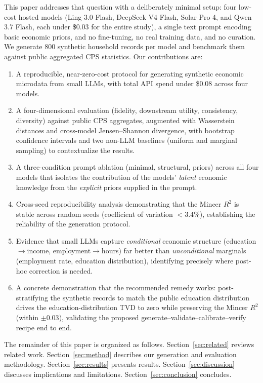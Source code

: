 \documentclass[11pt]{article}
\begin{document}
This paper addresses that question with a deliberately minimal setup: four low-cost hosted models (Ling 3.0 Flash, DeepSeek V4 Flash, Solar Pro 4, and Qwen 3.7 Flash, each under \$0.03 for the entire study), a single text prompt encoding basic economic priors, and no fine-tuning, no real training data, and no curation.
We generate 800 synthetic household records per model and benchmark them against public aggregated CPS statistics.
Our contributions are:

\begin{enumerate}[leftmargin=*, itemsep=2pt]
  \item A reproducible, near-zero-cost protocol for generating synthetic economic microdata from small LLMs, with total API spend under \$0.08 across four models.
  \item A four-dimensional evaluation (fidelity, downstream utility, consistency, diversity) against public CPS aggregates, augmented with Wasserstein distances and cross-model Jensen--Shannon divergence, with bootstrap confidence intervals and two non-LLM baselines (uniform and marginal sampling) to contextualize the results.
  \item A three-condition prompt ablation (minimal, structural, priors) across all four models that isolates the contribution of the models' \emph{latent} economic knowledge from the \emph{explicit} priors supplied in the prompt.
  \item Cross-seed reproducibility analysis demonstrating that the Mincer $R^2$ is stable across random seeds (coefficient of variation $< 3.4\%$), establishing the reliability of the generation protocol.
  \item Evidence that small LLMs capture \emph{conditional} economic structure (education$\rightarrow$income, employment$\rightarrow$hours) far better than \emph{unconditional} marginals (employment rate, education distribution), identifying precisely where post-hoc correction is needed.
  \item A concrete demonstration that the recommended remedy works: post-stratifying the synthetic records to match the public education distribution drives the education-distribution TVD to zero while preserving the Mincer $R^2$ (within $\pm 0.03$), validating the proposed generate--validate--calibrate--verify recipe end to end.
\end{enumerate}

The remainder of this paper is organized as follows.
Section~\ref{sec:related} reviews related work.
Section~\ref{sec:method} describes our generation and evaluation methodology.
Section~\ref{sec:results} presents results.
Section~\ref{sec:discussion} discusses implications and limitations.
Section~\ref{sec:conclusion} concludes.
\end{document}
